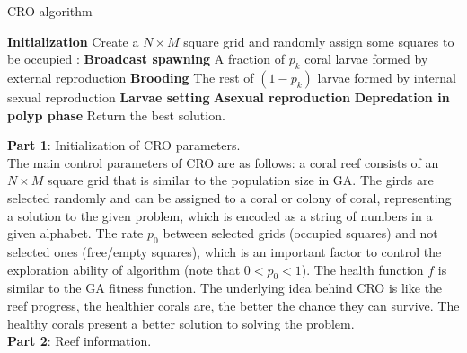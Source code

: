 \documentclass[11pt,twoside]{article}
\begin{document}
\begin{multicols}{2}
\begin{algorithm*}
\caption{CRO algorithm}
\label{algo_CRO}
\begin{algorithmic}[!t]
   \State \textbf{Initialization}
   \State Create a $N \times M$ square grid and randomly assign some squares to be occupied
   :
   \State \textbf{Broadcast spawning}
   \hspace*{\algorithmicindent} \State A fraction of $p_k$ coral larvae formed by external reproduction
   \State \textbf{Brooding}
   \hspace*{\algorithmicindent} \State The rest of $(1 - p_k)$ larvae formed by internal sexual reproduction
   \State \textbf{Larvae setting} %
   \State \textbf{Asexual reproduction} %
	\State \textbf{Depredation in polyp phase} 
   \EndWhile
   \State Return the best solution.           
\end{algorithmic}
\end{algorithm*}

\textbf{Part 1}: Initialization of CRO parameters.\\
The main control parameters of CRO are as follows: a coral reef consists of an $N \times M$ square grid that is similar to the population size in GA. The girds are selected randomly and can be assigned to a coral or colony of coral, representing a solution to the given problem, which is encoded as a string of numbers in a given alphabet. The rate $p_{0}$ between selected grids (occupied squares) and not selected ones (free/empty squares), which is an important factor to control the exploration ability of algorithm (note that $0<p_{0}<1$). The health function $f$ is similar to the GA fitness function. The underlying idea behind CRO is like the reef progress, the healthier corals are, the better the chance they can survive. The healthy corals present a better solution to solving the problem.\\


\textbf{Part 2}: Reef information. %


\end{multicols}
\end{document}
